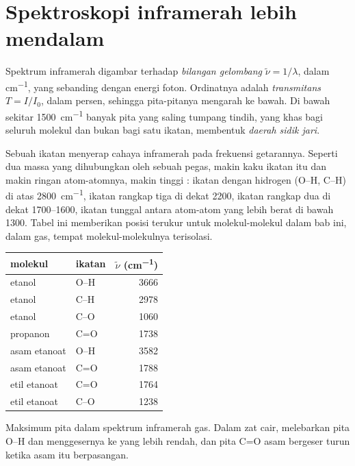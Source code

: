 \section{Spektroskopi inframerah lebih mendalam}

\begin{definition}\label{def:b1:structure-spectroscopy:wavenumber}
Spektrum inframerah digambar terhadap \emph{bilangan
gelombang} $\tilde\nu = 1/\lambda$, dalam
\unit{cm^{-1}}, yang sebanding dengan energi foton. Ordinatnya adalah
\emph{transmitans} $T = I/I_0$, dalam persen, sehingga
pita-pitanya mengarah ke bawah. Di bawah sekitar \qty{1500}{cm^{-1}}
banyak pita yang saling tumpang tindih, yang khas bagi seluruh molekul
dan bukan bagi satu ikatan, membentuk \emph{daerah sidik
jari}.
\end{definition}

Sebuah ikatan menyerap cahaya inframerah pada frekuensi getarannya.
Seperti dua massa yang dihubungkan oleh sebuah pegas, makin kaku ikatan
itu dan makin ringan atom-atomnya, makin tinggi :
ikatan dengan hidrogen (O--H, C--H) di atas \qty{2800}{cm^{-1}}, ikatan
rangkap tiga di dekat 2200, ikatan rangkap dua di dekat 1700--1600,
ikatan tunggal antara atom-atom yang lebih berat di bawah 1300. Tabel ini
memberikan posisi terukur untuk molekul-molekul dalam bab ini, dalam 
gas, tempat molekul-molekulnya terisolasi.

\begin{omfigure}
\begin{tabular}{llr}
\hline
molekul & ikatan & $\tilde\nu$ (\unit{cm^{-1}}) \\
\hline
etanol & O--H & 3666 \\
etanol & C--H & 2978 \\
etanol & C--O & 1060 \\
propanon & C=O & 1738 \\
asam etanoat & O--H & 3582 \\
asam etanoat & C=O & 1788 \\
etil etanoat & C=O & 1764 \\
etil etanoat & C--O & 1238 \\
\hline
\end{tabular}

\smallskip
{\small Maksimum pita dalam spektrum inframerah  gas. Dalam zat cair,
 melebarkan pita O--H dan menggesernya ke  yang lebih rendah, dan pita C=O asam bergeser turun ketika
asam itu berpasangan.}
\end{omfigure}

